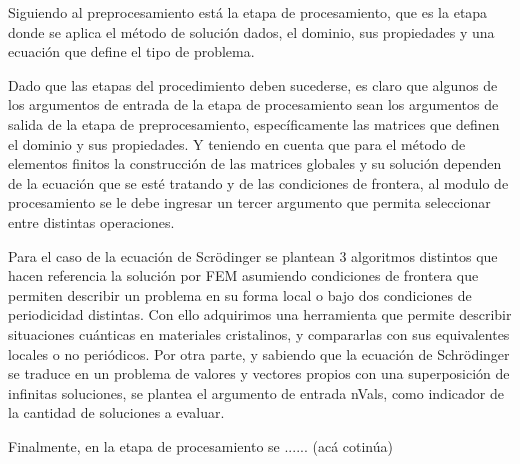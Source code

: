 \documentclass[12pt,letterpaper]{article}
\begin{document}
Siguiendo al preprocesamiento est\'a la etapa de procesamiento, que es la etapa donde se aplica el m\'etodo de soluci\'on dados, el
dominio, sus propiedades y una ecuaci\'on que define el tipo de problema.

Dado que las etapas del procedimiento deben sucederse, es claro que algunos de los argumentos de entrada de la etapa de
procesamiento sean los argumentos de salida de la etapa de preprocesamiento, espec\'ificamente las matrices que definen el dominio y sus
propiedades.  Y teniendo en cuenta que para el m\'etodo de elementos finitos la construcci\'on de las matrices globales y su soluci\'on
dependen de la ecuaci\'on  que se est\'e tratando y de las condiciones de frontera, al modulo de procesamiento se le debe ingresar un tercer
argumento que permita seleccionar entre distintas operaciones.

Para el caso de la ecuaci\'on de Scr\"odinger se plantean 3 algoritmos distintos que hacen referencia la soluci\'on por FEM
asumiendo condiciones de frontera que permiten describir un problema en su forma local o bajo dos condiciones de periodicidad distintas. Con
ello adquirimos una herramienta que permite describir situaciones cu\'anticas en materiales cristalinos, y compararlas con sus equivalentes
locales o no peri\'odicos. 
Por otra parte, y sabiendo que la ecuaci\'on de Schr\"odinger se traduce en un problema de valores y vectores propios con una
superposici\'on de infinitas soluciones, se plantea el argumento de entrada nVals, como indicador de la cantidad de soluciones a evaluar.

Finalmente, en la etapa de procesamiento se ...... (ac\'a cotin\'ua)
\end{document}
